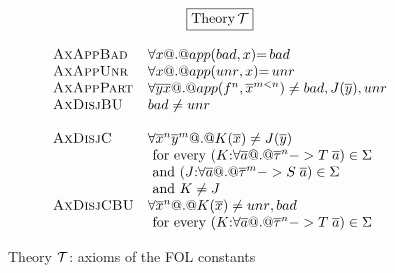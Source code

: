 \documentclass[preprint]{sigplanconf}
\begin{document}
\begin{figure}
\setlength{\arraycolsep}{1pt}
\[\begin{array}{c}
\fbox{$\mbox{Theory}\,{\cal T}$} \\ \\ 
\begin{array}{ll}
 \textsc{AxAppBad}  & {\forall x @.@ app(\mathop{bad},x){=}\mathop{bad}}  \\
 \textsc{AxAppUnr}  & {\forall x @.@ app(\mathop{unr},x){=}\mathop{unr}}    \\
 \textsc{AxAppPart} & {\forall \overline{y}\overline{x} @.@ app(f^n, \overline{x}^{m < n}) \neq \mathop{bad},J(\overline{y}),\mathop{unr}} \\
 \textsc{AxDisjBU} & {\mathop{bad} \neq \mathop{unr}}  \\
\\
 \textsc{AxDisjC} & {\forall \overline{x}^{n}\overline{y}^{m} @.@ K(\overline{x}) \neq J(\overline{y})} \\
                  & \mbox{ for every } (K{:}\forall\overline{a} @.@ \overline{\tau}^{n} -> T\;\overline{a}) \in \Sigma \\
                  & \mbox{ and } (J{:}\forall\overline{a} @.@ \overline{\tau}^{m} -> S\;\overline{a}) \in \Sigma \\
                  & \mbox{ and } K \neq J \\
 \textsc{AxDisjCBU} & {\forall \overline{x}^{n} @.@ K(\overline{x}) \neq \mathop{unr},\mathop{bad}} \\
                  & \mbox{ for every } (K{:}\forall\overline{a} @.@ \overline{\tau}^{n} -> T\;\overline{a}) \in \Sigma \\

\end{array}
\end{array}\]
\caption{Theory ${\cal T}$: axioms of the FOL constants}\label{fig:prelude} \label{fig:data-cons}
\end{figure}
\end{document}
